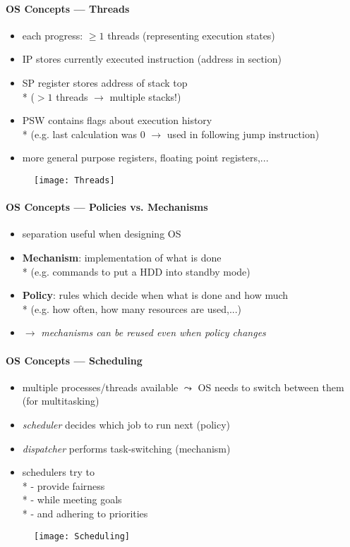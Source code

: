 \paragraph{OS Concepts --- Threads}
\begin{itemize}
	\item each progress: \( \geq 1 \) threads (representing execution states)
	\item IP stores currently executed instruction (address in  section)
	\item SP register stores address of stack top \\* (\( > 1 \) threads \( \to \) multiple stacks!)
	\item PSW contains flags about execution history \\* (e.g. last calculation was 0 \( \to \) used in following jump instruction)
	\item more general purpose registers, floating point registers,...
\end{itemize}
\begin{figure}[h]\centering\label{Threads}\texttt{[image: Threads]}\end{figure}

\paragraph{OS Concepts --- Policies vs. Mechanisms}
\begin{itemize}
	\item separation useful when designing OS
	\item \textbf{Mechanism}: implementation of what is done \\* (e.g. commands to put a HDD into standby mode)
	\item \textbf{Policy}: rules which decide when what is done and how much \\* (e.g. how often, how many resources are used,...)
	\item \( \to \) \emph{mechanisms can be reused even when policy changes}
\end{itemize}

\paragraph{OS Concepts --- Scheduling}
\begin{itemize}
	\item multiple processes/threads available \( \leadsto \) OS needs to switch between them (for multitasking)
	\item \emph{scheduler} decides which job to run next (policy)
	\item \emph{dispatcher} performs task-switching (mechanism)
	\item schedulers try to \\*
		- provide fairness \\*
		- while meeting goals \\*
		- and adhering to priorities
\end{itemize}
\begin{figure}[h]\centering\label{Scheduling}\texttt{[image: Scheduling]}\end{figure}

